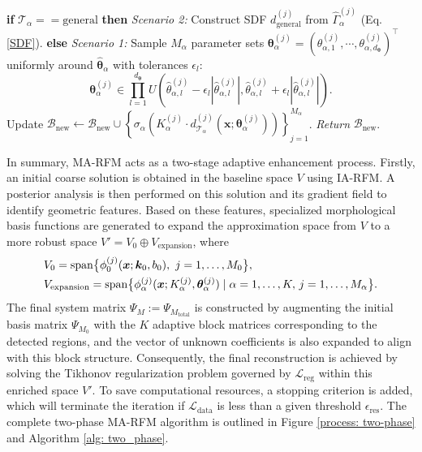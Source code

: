 \documentclass{article}
\theoremstyle{plain}
\theoremstyle{definition}
\begin{document}
{\begin{algorithm}[H]
\begin{algorithmic}[1]
    \STATE \textbf{if} $\mathcal{T}_\alpha == \text{general}$ \textbf{then} \emph{Scenario 2:} Construct SDF $d_{\text{general}}^{(j)}$ from $\hat{\Gamma}_\alpha^{(j)}$ (Eq. \ref{SDF}).
    \STATE \textbf{else} \emph{Scenario 1:} Sample $M_\alpha$ parameter sets $\boldsymbol{\theta}_\alpha^{(j)}=(\theta_{\alpha,1}^{(j)},\cdots,\theta_{\alpha,d_{\boldsymbol{\theta}}}^{(j)})^\top$ uniformly around $\hat{\boldsymbol{\theta}}_\alpha$ with tolerances $\epsilon_l$:
    \[
    \boldsymbol{\theta}_\alpha^{(j)} \in \prod_{l=1}^{d_{\boldsymbol{\theta}}} U\left( \hat{\theta}_{\alpha,l}^{(j)}-\epsilon_l |\hat{\theta}_{\alpha,l}^{(j)}|, \hat{\theta}_{\alpha,l}^{(j)}+\epsilon_l|\hat{\theta}_{\alpha,l}^{(j)}| \right).
    \]
    \STATE Update $\mathcal{B}_{\text{new}} \gets \mathcal{B}_{\text{new}} \cup \left\{ \sigma_{\alpha}\left(K_\alpha^{(j)} \cdot d_{\mathcal{T}_\alpha}^{(j)}(\boldsymbol{x};\boldsymbol{\theta}_\alpha^{(j)}) \right)\right\}_{j=1}^{M_\alpha}$.
\ENDFOR
\STATE \emph{Return} $\mathcal{B}_{\text{new}}$.
\end{algorithmic}
\end{algorithm}
In summary, MA-RFM acts as a two-stage adaptive enhancement process. Firstly, an initial coarse solution is obtained in the baseline space $V$ using IA-RFM. A posterior analysis is then performed on this solution and its gradient field to identify geometric features. Based on these features, specialized morphological basis functions are generated to expand the approximation space from $V$ to a more robust space 
$V' = V_0 \oplus V_{\text{expansion}}$, where
 {\begin{align}
\label{expansion_V}
&V_0 = \text{span}\bigl\{ \phi_0^{(j)}(\boldsymbol{x}; \boldsymbol{k}_0, b_0),\ j=1,\ldots, M_0 \bigr\}, \notag \\
&V_{\text{expansion}} = \text{span}\bigl\{ \phi_{\alpha}^{(j)}(\boldsymbol{x}; K_\alpha^{(j)}, \boldsymbol{\theta}_{\alpha}^{(j)}) \mid \alpha=1,\dots,K, \, j=1,\dots,M_\alpha \bigr\}.
\end{align}
The final system matrix $\Psi_M:=\Psi_{M_{\text{total}}}$ is constructed by augmenting the initial basis matrix $\Psi_{M_0}$ with the $K$ adaptive block matrices corresponding to the detected regions, and the vector of unknown coefficients is also expanded to align with this block structure.
Consequently, the final reconstruction is achieved by solving the Tikhonov regularization problem governed by $\mathcal{L}_{\text{reg}}$ within this enriched space $V'$.} To save computational resources,  a stopping criterion is added,  which will terminate the iteration if $\mathcal{L}_{\text{data}}$ is less than a given threshold $\epsilon_{\text{res}}$. 
The complete two-phase MA-RFM algorithm is outlined in Figure \ref{process: two-phase} and Algorithm \ref{alg: two_phase}.

}
\end{document}
